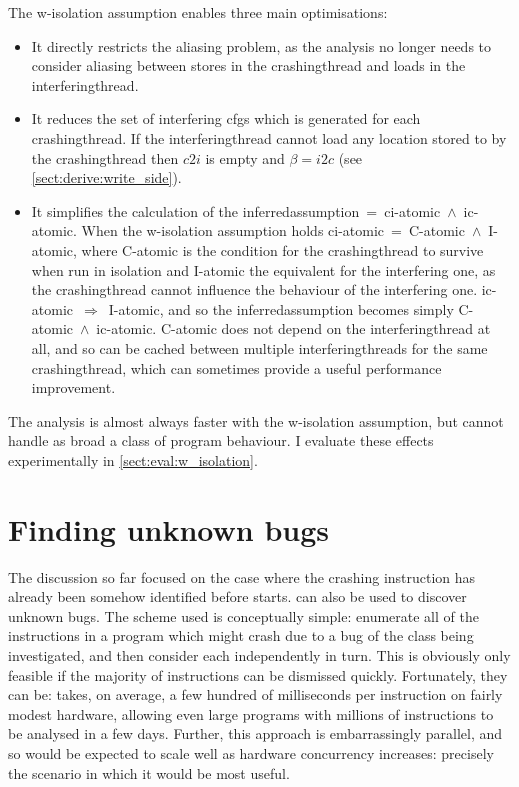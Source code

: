 {The \gls{w-isolation} assumption enables three main optimisations:

\begin{itemize}
\item
  It directly restricts the aliasing problem, as the analysis no
  longer needs to consider aliasing between stores in the
  \gls{crashingthread} and loads in the \gls{interferingthread}.
\item
  It reduces the set of interfering \glspl{cfg} which is generated for
  each \gls{crashingthread}.  If the \gls{interferingthread} cannot
  load any location stored to by the \gls{crashingthread} then $c2i$
  is empty and $\beta = i2c$ (see \autoref{sect:derive:write_side}).
\item
  It simplifies the calculation of the
  \gls{inferredassumption}~=~\gls{ci-atomic}~$\wedge$~\gls{ic-atomic}.
  When the \gls{w-isolation} assumption holds
  \gls{ci-atomic}~=~C-atomic~$\wedge$~I-atomic, where C-atomic is the
  condition for the \gls{crashingthread} to survive when run in
  isolation and I-atomic the equivalent for the interfering one, as
  the \gls{crashingthread} cannot influence the behaviour of the
  interfering one.  \gls{ic-atomic}~$\Rightarrow$~I-atomic, and so the
  \gls{inferredassumption} becomes simply
  C-atomic~$\wedge$~\gls{ic-atomic}.  C-atomic does not depend on the
  \gls{interferingthread} at all, and so can be cached between
  multiple \glspl{interferingthread} for the same
  \gls{crashingthread}, which can sometimes provide a useful
  performance improvement.
\end{itemize}
The analysis is almost always faster with the \gls{w-isolation}
assumption, but cannot handle as broad a class of program behaviour.
I evaluate these effects experimentally in
\autoref{sect:eval:w_isolation}.

\section{Finding unknown bugs}
\label{sect:derive:unknown_bugs}


The discussion so far focused on the case where the crashing
instruction has already been somehow identified before {\technique}
starts.  {\Technique} can also be used to discover unknown bugs.  The
scheme used is conceptually simple: enumerate all of the instructions
in a program which might crash due to a bug of the class being
investigated, and then consider each independently in turn.  This is
obviously only feasible if the majority of instructions can be
dismissed quickly.  Fortunately, they can be: {\implementation} takes,
on average, a few hundred of milliseconds per instruction on fairly
modest hardware, allowing even large programs with millions of
instructions to be analysed in a few days.  Further, this approach is
embarrassingly parallel, and so would be expected to scale well as
hardware concurrency increases: precisely the scenario in which it
would be most useful.

}
